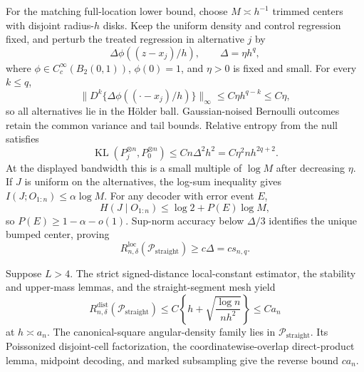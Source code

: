 For the matching full-location lower bound, choose \(M\asymp h^{-1}\) trimmed centers with disjoint radius-\(h\) disks.  Keep the uniform density and control regression fixed, and perturb the treated regression in alternative \(j\) by
\[
 \Delta\phi((z-x_j)/h),
 \qquad \Delta=\eta h^q,
\]
where \(\phi\in C_c^\infty(B_2(0,1))\), \(\phi(0)=1\), and \(\eta>0\) is fixed and small.  For every \(k\leq q\),
\[
 \lVert D^k\{\Delta\phi((\cdot-x_j)/h)\}\rVert_\infty
 \leq C\eta h^{q-k}\leq C\eta,
\]
so all alternatives lie in the H\"older ball.  Gaussian-noised Bernoulli outcomes retain the common variance and tail bounds.  Relative entropy from the null satisfies
\[
 \operatorname{KL}(P_j^{\otimes n},P_0^{\otimes n})
 \leq Cn\Delta^2h^2=C\eta^2nh^{2q+2}.
\]
At the displayed bandwidth this is a small multiple of \(\log M\) after decreasing \(\eta\).  If \(J\) is uniform on the alternatives, the log-sum inequality gives \(I(J;O_{1:n})\leq\alpha\log M\).  For any decoder with error event \(E\),
\[
 H(J\mid O_{1:n})\leq\log2+P(E)\log M,
\]
so \(P(E)\geq1-\alpha-o(1)\).  Sup-norm accuracy below \(\Delta/3\) identifies the unique bumped center, proving
\[
 R_{n,\delta}^{\mathrm{loc}}(\mathcal P_{\mathrm{straight}})
 \geq c\Delta=cs_{n,q}.
\]

Suppose \(L>4\).  The strict signed-distance local-constant estimator, the stability and upper-mass lemmas, and the straight-segment mesh yield
\[
 R_{n,\delta}^{\mathrm{dist}}(\mathcal P_{\mathrm{straight}})
 \leq C\left\{h+\sqrt{\frac{\log n}{nh^2}}\right\}\leq Ca_n
\]
at \(h\asymp a_n\).  The canonical-square angular-density family lies in \(\mathcal P_{\mathrm{straight}}\).  Its Poissonized disjoint-cell factorization, the coordinatewise-overlap direct-product lemma, midpoint decoding, and marked subsampling give the reverse bound \(ca_n\).

